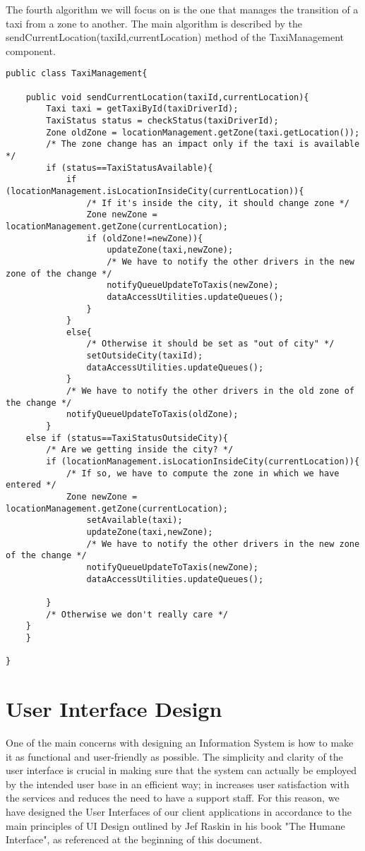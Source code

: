 The fourth algorithm we will focus on is the one that manages the transition of a taxi from a zone to another. The main algorithm is described by the sendCurrentLocation(taxiId,currentLocation) method of the TaxiManagement component.

\begin{lstlisting}
public class TaxiManagement{
	
	public void sendCurrentLocation(taxiId,currentLocation){
		Taxi taxi = getTaxiById(taxiDriverId);
		TaxiStatus status = checkStatus(taxiDriverId);
		Zone oldZone = locationManagement.getZone(taxi.getLocation());
		/* The zone change has an impact only if the taxi is available */
		if (status==TaxiStatusAvailable){
			if (locationManagement.isLocationInsideCity(currentLocation)){
				/* If it's inside the city, it should change zone */
				Zone newZone = locationManagement.getZone(currentLocation);
				if (oldZone!=newZone)){
					updateZone(taxi,newZone);
					/* We have to notify the other drivers in the new zone of the change */
					notifyQueueUpdateToTaxis(newZone);
					dataAccessUtilities.updateQueues();
				}
			}
			else{
				/* Otherwise it should be set as "out of city" */
				setOutsideCity(taxiId);
				dataAccessUtilities.updateQueues();
			}
			/* We have to notify the other drivers in the old zone of the change */
			notifyQueueUpdateToTaxis(oldZone);
		}
	else if (status==TaxiStatusOutsideCity){
		/* Are we getting inside the city? */
		if (locationManagement.isLocationInsideCity(currentLocation)){
			/* If so, we have to compute the zone in which we have entered */
			Zone newZone = locationManagement.getZone(currentLocation);
				setAvailable(taxi);
				updateZone(taxi,newZone);
				/* We have to notify the other drivers in the new zone of the change */
				notifyQueueUpdateToTaxis(newZone);
				dataAccessUtilities.updateQueues();
				
		}
		/* Otherwise we don't really care */
	}
	}
	
}
\end{lstlisting}

\chapter{User Interface Design}
One of the main concerns with designing an Information System is how to make it as functional and user-friendly as possible. The simplicity and clarity of the user interface is crucial in making sure that the system can actually be employed by the intended user base in an efficient way; in increases user satisfaction with the services and reduces the need to have a support staff. 
For this reason, we have designed the User Interfaces of our client applications in accordance to the main principles of UI Design outlined by Jef Raskin in his book "The Humane Interface", as referenced at the beginning of this document. 

